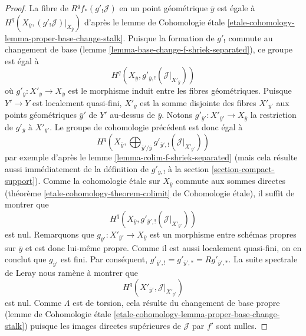 \begin{proof}
\medskip\noindent
La fibre de $R^qf_*(g'_!\mathcal{J})$ en un point géométrique
$\overline{y}$ est égale à
$H^q(X_{\overline{y}}, (g'_!\mathcal{J})|_{X_{\overline{y}}})$ d'après le
lemme de Cohomologie étale
\ref{etale-cohomology-lemma-proper-base-change-stalk}.
Puisque la formation de $g'_!$ commute au changement de base
(lemme \ref{lemma-base-change-f-shriek-separated}),
ce groupe est égal à
$$
H^q(X_{\overline{y}}, g'_{\overline{y}, !}(\mathcal{J}|_{X'_{\overline{y}}}))
$$
où $g'_{\overline{y}} : X'_{\overline{y}} \to X_{\overline{y}}$
est le morphisme induit entre les fibres géométriques.
Puisque $Y' \to Y$ est localement quasi-fini,
$X'_{\overline{y}}$ est la somme disjointe des fibres
$X'_{\overline{y}'}$ aux points géométriques $\overline{y}'$ de $Y'$
au-dessus de $\overline{y}$. Notons
$g'_{\overline{y}'} : X'_{\overline{y}'} \to X_{\overline{y}}$
la restriction de $g'_{\overline{y}}$ à $X'_{\overline{y}'}$.
Le groupe de cohomologie précédent est donc égal à
$$
H^q(X_{\overline{y}},
\bigoplus\nolimits_{\overline{y}'/\overline{y}}
g'_{\overline{y}', !}(\mathcal{J}|_{X'_{\overline{y}'}}))
$$
par exemple d'après le lemme \ref{lemma-colim-f-shriek-separated} (mais cela
résulte aussi immédiatement de la définition de $g'_{\overline{y}, !}$
à la section \ref{section-compact-support}).
Comme la cohomologie étale sur $X_{\overline{y}}$
commute aux sommes directes
(théorème \ref{etale-cohomology-theorem-colimit} de Cohomologie étale),
il suffit de montrer que
$$
H^q(X_{\overline{y}}, g'_{\overline{y}', !}(\mathcal{J}|_{X'_{\overline{y}'}}))
$$
est nul. Remarquons que
$g_{\overline{y}'} : X'_{\overline{y}'} \to X_{\overline{y}}$
est un morphisme entre schémas propres sur $\overline{y}$ et est donc
lui-même propre. Comme il est aussi localement quasi-fini, on en conclut que
$g_{\overline{y}'}$ est fini. Par conséquent,
$g'_{\overline{y}', !} = g'_{\overline{y}', *} = Rg'_{\overline{y}', *}$.
La suite spectrale de Leray nous ramène à montrer que
$$
H^q(X'_{\overline{y}'}, \mathcal{J}|_{X'_{\overline{y}'}})
$$
est nul. Comme $\Lambda$ est de torsion, cela résulte du changement de base propre
(lemme de Cohomologie étale
\ref{etale-cohomology-lemma-proper-base-change-stalk})
puisque les images directes supérieures de $\mathcal{J}$ par $f'$ sont nulles.


\end{proof}
